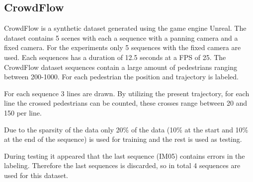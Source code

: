 \subsection{CrowdFlow}
CrowdFlow is a synthetic dataset generated using the game engine Unreal. The dataset contains 5 scenes with each a sequence with a panning camera and a fixed camera. For the experiments only 5 sequences with the fixed camera are used. Each sequences has a duration of 12.5 seconds at a FPS of 25. The CrowdFlow dataset sequences contain a large amount of pedestrians ranging between 200-1000. For each pedestrian the position and trajectory is labeled. 

For each sequence 3 lines are drawn. By utilizing the present trajectory, for each line the crossed pedestrians can be counted, these crosses range between 20 and 150 per line.

Due to the sparsity of the data only 20\% of the data (10\% at the start and 10\% at the end of the sequence) is used for training and the rest is used as testing.

During testing it appeared that the last sequence (IM05) contains errors in the labeling. Therefore the last sequences is discarded, so in total 4 sequences are used for this dataset.